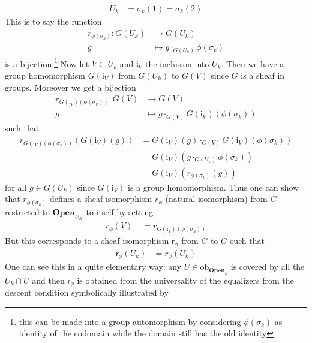 \begin{exa}
\begin{align*}
  U_{k}
  &=
  \sigma_{k}(1)
  =
  \sigma_{k}(2)
\end{align*}
This is to say the function
\begin{align*}
  r_{\phi(\sigma_{k})}
  \colon
  G(U_{k})
  &\rightarrow
  G(U_{k})
  \\
  g
  &\mapsto
  g
  \cdot_{G(U_{k})}
  \phi(\sigma_{k})
\end{align*}
is a bijection.\footnote{this can be made into a group automorphism by considering $\phi(\sigma_{k})$ as identity of the codomain while the domain still has the old identity} Now let $V \subset U_{k}$ and $\mathrm{i}_{V}$ the inclusion into $U_{k}$.
Then we have a group homomorphism $G(\mathrm{i}_{V})$ from $G(U_{k})$ to $G(V)$ since $G$ is a sheaf in groups.
Moreover we get a bijection
\begin{align*}
  r_{G(\mathrm{i}_{V})(\phi(\sigma_{k}))}
  \colon
  G(V)
  &\rightarrow
  G(V)
  \\
  g
  &\mapsto
  g
  \cdot_{G(V)}
  G(\mathrm{i}_{V})
  \left(
    \phi(\sigma_{k})
  \right)
\end{align*}
such that
\begin{align*}
  r_{G(\mathrm{i}_{V})(\phi(\sigma_{k}))}
  \left(
    G(\mathrm{i}_{V})(g)
  \right)
  &=
  G(\mathrm{i}_{V})(g)
  \cdot_{G(V)}
  G(\mathrm{i}_{V})
  \left(
    \phi(\sigma_{k})
  \right)
  \\
  &=
  G(\mathrm{i}_{V})
  \left(
    g
    \cdot_{G(U_{k})}
    \phi(\sigma_{k})
  \right)
  \\
  &=
  G(\mathrm{i}_{V})
  \left(
    r_{\phi(\sigma_{k})}(g)
  \right)
\end{align*}
for all $g \in G(U_{k})$ since $G(\mathrm{i}_{V})$ is a group homomorphism.
Thus one can show that $r_{\phi(\sigma_{k})}$ defines a sheaf isomorphism $r_{\phi}$ (natural isomorphism) from $G$ restricted to $\mathbf{Open}_{U_{K}}$ to itself by setting
\begin{align*}
  r_{\phi}(V)
  &:=
  r_{G(\mathrm{i}_{V})(\phi(\sigma_{k}))}
\end{align*}
But this corresponds to a sheaf isomorphism $\mathsf{r}_{\phi}$ from $G$ to $G$ such that
\begin{align*}
  \mathsf{r}_{\phi}(U_{k})
  &=
  r_{\phi}(U_{k})
\end{align*}
One can see this in a quite elementary way: any $U \in \mathrm{ob}_{\mathbf{Open}_{S}}$ is covered by all the $U_{k} \cap U$ and then $\mathsf{r}_{\phi}$ is obtained from the universality of the equalizers from the descent condition symbolically illustrated by

\end{exa}
